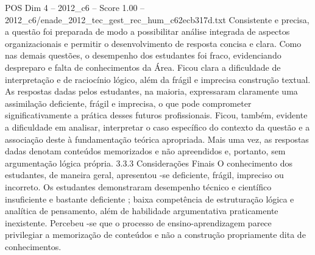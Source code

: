 \begin{textsample}{POS Dim 4 – 2012\_c6 – Score 1.00 – 2012\_c6/enade\_2012\_tec\_gest\_rec\_hum\_c62ecb317d.txt}
Consistente e precisa, a questão foi preparada de modo a possibilitar análise integrada de aspectos organizacionais e permitir o desenvolvimento de resposta concisa e clara.
Como nas demais questões, o desempenho dos estudantes foi fraco, evidenciando despreparo e falta de conhecimentos da Área.
Ficou clara a dificuldade de interpretação e de raciocínio lógico, além da frágil e imprecisa construção textual.
As respostas dadas pelos estudantes, na maioria, expressaram claramente uma assimilação deficiente, frágil e imprecisa, o que pode comprometer significativamente a prática desses futuros profissionais.
Ficou, também, evidente a dificuldade em analisar, interpretar o caso específico do contexto da questão e a associação deste à fundamentação teórica apropriada.
Mais uma vez, as respostas dadas denotam conteúdos memorizados e não apreendidos e, portanto, sem argumentação lógica própria. 3.3.3 Considerações Finais O conhecimento dos estudantes, de maneira geral, apresentou -se deficiente, frágil, impreciso ou incorreto.
Os estudantes demonstraram desempenho técnico e científico insuficiente e bastante deficiente ; baixa competência de estruturação lógica e analítica de pensamento, além de habilidade argumentativa praticamente inexistente.
Percebeu -se que o processo de ensino-aprendizagem parece privilegiar a memorização de conteúdos e não a construção propriamente dita de conhecimentos.

\end{textsample}
